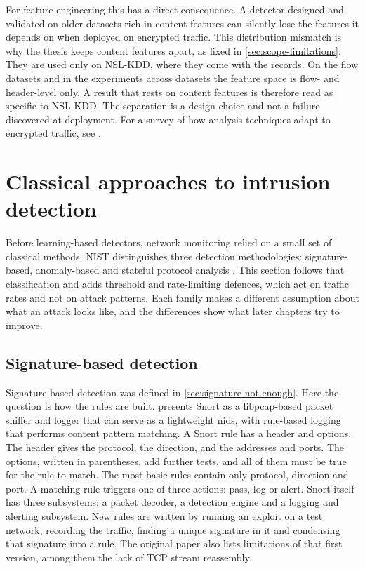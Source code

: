 For feature engineering this has a direct consequence. A detector designed
and validated on older datasets rich in content features can silently lose
the features it depends on when deployed on encrypted traffic. This
distribution mismatch is why the thesis keeps content features apart, as
fixed in \cref{sec:scope-limitations}. They are used only on NSL-KDD, where
they come with the records. On the flow datasets and in the experiments
across datasets the feature space is flow- and header-level only. A result
that rests on content features is therefore read as specific to NSL-KDD. The
separation is a design choice and not a failure discovered at deployment. For a survey of how analysis
techniques adapt to encrypted traffic, see \citet{papadogiannaki2021encryptedsurvey}.

\section{Classical approaches to intrusion detection}
\label{sec:classical-approaches}

Before learning-based detectors, network monitoring relied on a small set of
classical methods. NIST distinguishes three detection methodologies:
signature-based, anomaly-based and stateful protocol analysis
\citep{scarfone2007nist80094}. This section follows that classification and
adds threshold and rate-limiting defences, which act on traffic rates and not
on attack patterns. Each family makes a different assumption about what an
attack looks like, and the differences show what later chapters try to
improve.

\subsection{Signature-based detection}
\label{sec:signature-rulesets}

Signature-based detection was defined in \cref{sec:signature-not-enough}.
Here the question is how the rules are built. \citet{roesch1999snort}
presents Snort as a libpcap-based packet sniffer and logger that can serve as
a lightweight \gls{nids}, with rule-based logging that performs content
pattern matching. A Snort rule has a header and options. The header gives the
protocol, the direction, and the addresses and ports. The options, written in
parentheses, add further tests, and all of them must be true for the rule to
match. The most basic rules contain only protocol, direction and port. A
matching rule triggers one of three actions: pass, log or alert. Snort itself
has three subsystems: a packet decoder, a detection engine and a logging and
alerting subsystem. New rules are written by running an exploit on a test
network, recording the traffic, finding a unique signature in it and
condensing that signature into a rule. The original paper also lists
limitations of that first version, among them the lack of TCP stream
reassembly.

